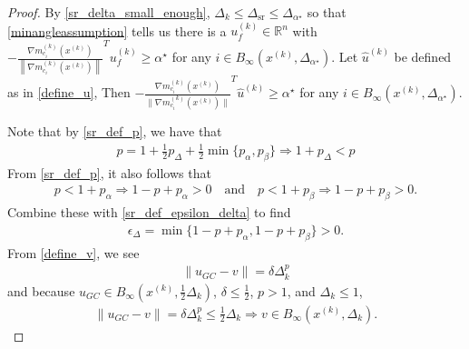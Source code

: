 \documentclass{article}
\theoremstyle{case}
\numberwithin{theorem}{subsection}
\newcommand{\dk}{\Delta_k}
\newcommand{\dsr}{{\Delta_{\textrm{sr}}}}
\newcommand{\gmcik}{{\nabla m_{c_i}^{(k)}\left(\xk\right)}}
\newcommand{\huk}{{{\hat u}^{(k)}}}
\newcommand{\minanglealpha}{{ \alpha^{\star} }}
\newcommand{\minangledelta}{{\Delta_{\alpha^{\star}}}}
\newcommand{\Rn}{\mathbb R^n}
\newcommand{\tr}{{ B_{\infty}\left(\xk, \dk\right) }}
\newcommand{\xk}{x^{(k)}}
\newcommand{\minangledirk}{{u^{(k)}_f}}
\begin{document}
\begin{proof}
By \cref{sr_delta_small_enough}, $\dk \le \dsr \le \minangledelta$ so that \cref{minangleassumption}
tells us there is a $ \minangledirk \in \Rn$ with
$-\frac {\gmcik}{\left\|\gmcik\right\|} ^T \minangledirk \ge \minanglealpha$ for any $i \in B_{\infty}\left(\xk, \minangledelta\right)$.
Let $\huk$ be defined as in \cref{define_u},
Then $-\frac {\gmcik}{\|\gmcik\|} ^T\huk \ge \minanglealpha$ for any $i \in B_{\infty}\left(\xk, \minangledelta\right)$.

Note that by \cref{sr_def_p}, we have that
\begin{align}
p = 1 + \frac 1 2 p_{\Delta} + \frac 1 2 \min\{p_{\alpha}, p_{\beta} \} \Longrightarrow 1 + p_{\Delta} < p \label{sr_p_big}
\end{align}
From \cref{sr_def_p}, it also follows that
\begin{align}
p < 1 + p_{\alpha} \Longrightarrow 1 - p + p_{\alpha} > 0   \quad \textrm{and} \quad
p < 1 + p_{\beta}\Longrightarrow 1 - p + p_{\beta} > 0. \label{sr_p_small_alpha_beta}
\end{align}
Combine these with \cref{sr_def_epsilon_delta} to find
\begin{align}
\epsilon_{\Delta} = \min\{1 - p + p_{\alpha}, 1 - p + p_{\beta} \} > 0 \label{sr_epsilon_delta_positive}.
\end{align}
From \cref{define_v}, we see
\begin{align}
\|u_{GC} - v\| = \delta \dk^{p} \label{sr_v_close_u}
\end{align}
and because $u_{GC} \in B_{\infty}(\xk, \frac 1 2 \dk)$, $\delta \le \frac 1 2 $, $p > 1$, and $\dk \le 1$,
\begin{align*}
\|u_{GC} - v\| = \delta \dk^{p} \le \frac 1 2\dk \Longrightarrow v \in \tr.
\end{align*}



\end{proof}
\end{document}
